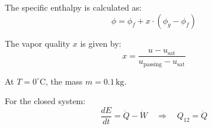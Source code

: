 The specific enthalpy is calculated as:  
\[
\phi = \phi_f + x \cdot (\phi_g - \phi_f)
\]  

The vapor quality \( x \) is given by:  
\[
x = \frac{u - u_{\text{sat}}}{u_{\text{passing}} - u_{\text{sat}}}
\]  

At \( T = 0^\circ\text{C} \), the mass \( m = 0.1 \, \text{kg} \).  

For the closed system:  
\[
\frac{dE}{dt} = \dot{Q} - \dot{W} \quad \Rightarrow \quad Q_{12} = \dot{Q}
\]